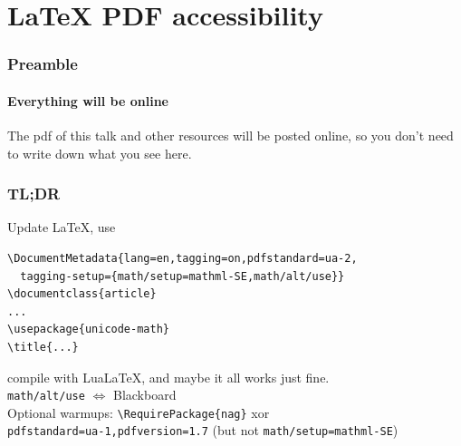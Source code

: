  {\tagmcend\tagstructend\tagmcbegin{}}
 

\def\qrcode@hyperwrapper@hyperref#1{%
  \href{\qr@texttoencode}%
   {\UseTaggingSocket{qrcode/begin}\SuspendTagging{qrcode}%
    #1\ResumeTagging{qrcode}\UseTaggingSocket{qrcode/end}}}
 
\def\qrcode@hyperwrapper@nohyperref#1{%
  \UseTaggingSocket{qrcode/begin}\SuspendTagging{qrcode}%
  #1\ResumeTagging{qrcode}\UseTaggingSocket{qrcode/end}}

\patchcmd\qrcode@int{\relax}{\qrcode@hyperwrapper@nohyperref}{}{\fail}

\makeatother




\section{\texorpdfstring{\LaTeX}{LaTeX} PDF accessibility}

\begin{frame}
\maketitle
\end{frame}

\begin{frame}
\frametitle{Preamble}
\framesubtitle{Everything will be online}
The pdf of this talk and other resources will be posted online, so you don't need to write down what you see here.
\end{frame}


\begin{frame*}
\frametitle{TL;DR}
Update \LaTeX, use
\begin{verbatim}
\DocumentMetadata{lang=en,tagging=on,pdfstandard=ua-2,
  tagging-setup={math/setup=mathml-SE,math/alt/use}}
\documentclass{article}
...
\usepackage{unicode-math}
\title{...}
\end{verbatim}
compile with Lua\LaTeX, and maybe it all works just fine.\\
\texttt{math/alt/use} $\Leftrightarrow$ Blackboard\\
Optional warmups: \verb|\RequirePackage{nag}| xor\\
\qquad\texttt{pdfstandard=ua-1,pdfversion=1.7} (but not \texttt{math/setup=mathml-SE})
\end{frame*}

